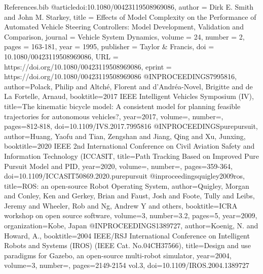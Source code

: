 \documentclass[a4paper,12pt,sort&compress]{article}
\begin{document}
\begin{filecontents}{References.bib}
    @article{doi:10.1080/00423119508969086,
        author = { Dirk E.   Smith  and  John M. Starkey},
        title = {Effects of Model Complexity on the Performance of Automated Vehicle Steering Controllers: Model Development, Validation and Comparison},
        journal = {Vehicle System Dynamics},
        volume = {24},
        number = {2},
        pages = {163-181},
        year  = {1995},
        publisher = {Taylor & Francis},
        doi = {10.1080/00423119508969086},
        URL = {https://doi.org/10.1080/00423119508969086},
        eprint = { https://doi.org/10.1080/00423119508969086}
    }
    @INPROCEEDINGS{7995816,
        author={Polack, Philip and Altché, Florent and d'Andréa-Novel, Brigitte and de La Fortelle, Arnaud},
        booktitle={2017 IEEE Intelligent Vehicles Symposium (IV)}, 
        title={The kinematic bicycle model: A consistent model for planning feasible trajectories for autonomous vehicles?}, 
        year={2017},
        volume={},
        number={},
        pages={812-818},
        doi={10.1109/IVS.2017.7995816}
    }
    @INPROCEEDINGS{purepursuit,
        author={Huang, Yaofu and Tian, Zengshan and Jiang, Qing and Xu, Junxing},
        booktitle={2020 IEEE 2nd International Conference on Civil Aviation Safety and Information Technology (ICCASIT}, 
        title={Path Tracking Based on Improved Pure Pursuit Model and PID}, 
        year={2020},
        volume={},
        number={},
        pages={359-364},
        doi={10.1109/ICCASIT50869.2020.purepursuit}
    }
    @inproceedings{quigley2009ros,
        title={ROS: an open-source Robot Operating System},
        author={Quigley, Morgan and Conley, Ken and Gerkey, Brian and Faust, Josh and Foote, Tully and Leibs, Jeremy and Wheeler, Rob and Ng, Andrew Y and others},
        booktitle={ICRA workshop on open source software},
        volume={3},
        number={3.2},
        pages={5},
        year={2009},
        organization={Kobe, Japan}
    }
    @INPROCEEDINGS{1389727,
        author={Koenig, N. and Howard, A.},
        booktitle={2004 IEEE/RSJ International Conference on Intelligent Robots and Systems (IROS) (IEEE Cat. No.04CH37566)}, 
        title={Design and use paradigms for Gazebo, an open-source multi-robot simulator}, 
        year={2004},
        volume={3},
        number={},
        pages={2149-2154 vol.3},
        doi={10.1109/IROS.2004.1389727}
    }

\end{filecontents}
\end{document}
